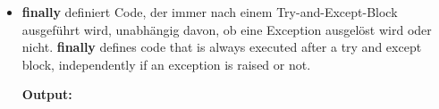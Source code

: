 \documentclass[12pt,c, german, aspectratio=169]{beamer} %
\begin{document}
      \begin{frame}{}
        \begin{itemize}
          \item \trans
          {\textbf{finally} definiert Code, der immer nach einem Try-and-Except-Block ausgeführt wird, unabhängig davon, ob eine Exception ausgelöst wird oder nicht.}
          {\textbf{finally} defines code that is always executed after a try and except block, independently if an exception is raised or not.}
           \\
          \vspace{0.3cm}
          {\footnotesize \textbf{Output:}}
           \\
            \vspace{0.1cm}
        \end{itemize}
      \end{frame}
      
\end{document}
